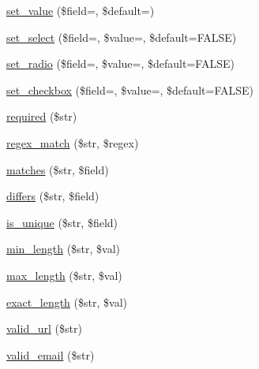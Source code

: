 \begin{DoxyCompactItemize}
\item 
\mbox{\hyperlink{class_c_i___form__validation_a8fa9dea1530cf8b47a2c92fa1a8bcb03}{set\+\_\+value}} (\$field=\textquotesingle{}\textquotesingle{}, \$default=\textquotesingle{}\textquotesingle{})
\item 
\mbox{\hyperlink{class_c_i___form__validation_a7f9795f9a9401f1b7c37009e14f83206}{set\+\_\+select}} (\$field=\textquotesingle{}\textquotesingle{}, \$value=\textquotesingle{}\textquotesingle{}, \$default=F\+A\+L\+SE)
\item 
\mbox{\hyperlink{class_c_i___form__validation_a0d72f27b7455e1416cb5cc7f0512179d}{set\+\_\+radio}} (\$field=\textquotesingle{}\textquotesingle{}, \$value=\textquotesingle{}\textquotesingle{}, \$default=F\+A\+L\+SE)
\item 
\mbox{\hyperlink{class_c_i___form__validation_a7a73b246b82ff228c0238806fe725d78}{set\+\_\+checkbox}} (\$field=\textquotesingle{}\textquotesingle{}, \$value=\textquotesingle{}\textquotesingle{}, \$default=F\+A\+L\+SE)
\item 
\mbox{\hyperlink{class_c_i___form__validation_a199cc68b369723805f9ab59459dfc427}{required}} (\$str)
\item 
\mbox{\hyperlink{class_c_i___form__validation_a5360f59cb1b624ea9f8aec348a9fc3bc}{regex\+\_\+match}} (\$str, \$regex)
\item 
\mbox{\hyperlink{class_c_i___form__validation_a2b51ee11056e55978a8934a87ce23a9b}{matches}} (\$str, \$field)
\item 
\mbox{\hyperlink{class_c_i___form__validation_ac4bab1eaa84f89bcaaf943e775f27927}{differs}} (\$str, \$field)
\item 
\mbox{\hyperlink{class_c_i___form__validation_a7f0fbd8cde50c2d92f7e71fc628a06c3}{is\+\_\+unique}} (\$str, \$field)
\item 
\mbox{\hyperlink{class_c_i___form__validation_af13a4f0757306ebe7355b95fb5b4bcd7}{min\+\_\+length}} (\$str, \$val)
\item 
\mbox{\hyperlink{class_c_i___form__validation_a6d76170ab65fbe583dd8850eae125628}{max\+\_\+length}} (\$str, \$val)
\item 
\mbox{\hyperlink{class_c_i___form__validation_af5c3a592db50ae4588ebfac80ca5bc97}{exact\+\_\+length}} (\$str, \$val)
\item 
\mbox{\hyperlink{class_c_i___form__validation_a6461c05af56d4969c1380421bd104041}{valid\+\_\+url}} (\$str)
\item 
\mbox{\hyperlink{class_c_i___form__validation_adbc9111bceb5b96f6ab20b218331d8d6}{valid\+\_\+email}} (\$str)

\end{DoxyCompactItemize}
